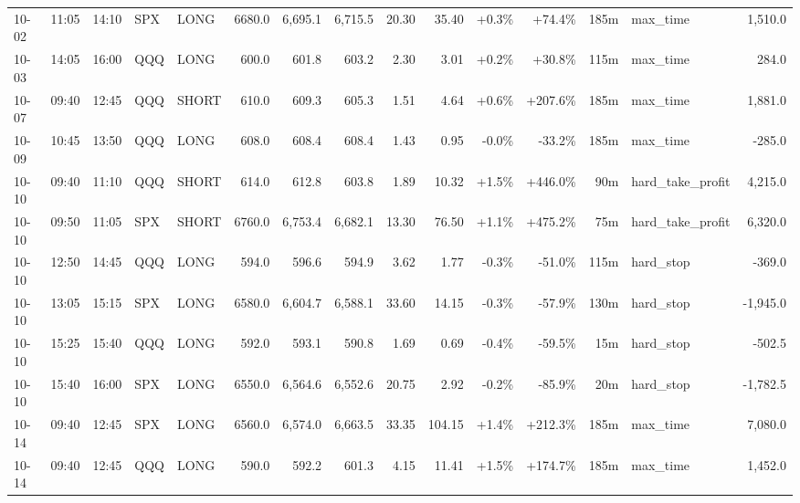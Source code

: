 \documentclass[11pt,a4paper,twoside]{article}
\begin{document}
\begin{landscape}
\begin{center}
\begin{longtable}{>{\color{txtmain}}l l l l l r r r r r r r r >{\color{txtmain}}l r}
10-02 & 11:05 & 14:10 & SPX & LONG & 6680.0 & 6,695.1 & 6,715.5 & 20.30 & 35.40 & \textcolor{wingreen}{+0.3\%} & \textcolor{wingreen}{+74.4\%} & 185m & max\_time & \textcolor{wingreen}{1,510.0} \\
10-03 & 14:05 & 16:00 & QQQ & LONG & 600.0 & 601.8 & 603.2 & 2.30 & 3.01 & \textcolor{wingreen}{+0.2\%} & \textcolor{wingreen}{+30.8\%} & 115m & max\_time & \textcolor{wingreen}{284.0} \\
10-07 & 09:40 & 12:45 & QQQ & SHORT & 610.0 & 609.3 & 605.3 & 1.51 & 4.64 & \textcolor{wingreen}{+0.6\%} & \textcolor{wingreen}{+207.6\%} & 185m & max\_time & \textcolor{wingreen}{1,881.0} \\
10-09 & 10:45 & 13:50 & QQQ & LONG & 608.0 & 608.4 & 608.4 & 1.43 & 0.95 & \textcolor{lossred}{-0.0\%} & \textcolor{lossred}{-33.2\%} & 185m & max\_time & \textcolor{lossred}{-285.0} \\
10-10 & 09:40 & 11:10 & QQQ & SHORT & 614.0 & 612.8 & 603.8 & 1.89 & 10.32 & \textcolor{wingreen}{+1.5\%} & \textcolor{wingreen}{+446.0\%} & 90m & hard\_take\_profit & \textcolor{wingreen}{4,215.0} \\
10-10 & 09:50 & 11:05 & SPX & SHORT & 6760.0 & 6,753.4 & 6,682.1 & 13.30 & 76.50 & \textcolor{wingreen}{+1.1\%} & \textcolor{wingreen}{+475.2\%} & 75m & hard\_take\_profit & \textcolor{wingreen}{6,320.0} \\
10-10 & 12:50 & 14:45 & QQQ & LONG & 594.0 & 596.6 & 594.9 & 3.62 & 1.77 & \textcolor{lossred}{-0.3\%} & \textcolor{lossred}{-51.0\%} & 115m & hard\_stop & \textcolor{lossred}{-369.0} \\
10-10 & 13:05 & 15:15 & SPX & LONG & 6580.0 & 6,604.7 & 6,588.1 & 33.60 & 14.15 & \textcolor{lossred}{-0.3\%} & \textcolor{lossred}{-57.9\%} & 130m & hard\_stop & \textcolor{lossred}{-1,945.0} \\
10-10 & 15:25 & 15:40 & QQQ & LONG & 592.0 & 593.1 & 590.8 & 1.69 & 0.69 & \textcolor{lossred}{-0.4\%} & \textcolor{lossred}{-59.5\%} & 15m & hard\_stop & \textcolor{lossred}{-502.5} \\
10-10 & 15:40 & 16:00 & SPX & LONG & 6550.0 & 6,564.6 & 6,552.6 & 20.75 & 2.92 & \textcolor{lossred}{-0.2\%} & \textcolor{lossred}{-85.9\%} & 20m & hard\_stop & \textcolor{lossred}{-1,782.5} \\
10-14 & 09:40 & 12:45 & SPX & LONG & 6560.0 & 6,574.0 & 6,663.5 & 33.35 & 104.15 & \textcolor{wingreen}{+1.4\%} & \textcolor{wingreen}{+212.3\%} & 185m & max\_time & \textcolor{wingreen}{7,080.0} \\
10-14 & 09:40 & 12:45 & QQQ & LONG & 590.0 & 592.2 & 601.3 & 4.15 & 11.41 & \textcolor{wingreen}{+1.5\%} & \textcolor{wingreen}{+174.7\%} & 185m & max\_time & \textcolor{wingreen}{1,452.0} \\

\end{longtable}
\end{center}
\end{landscape}
\end{document}
